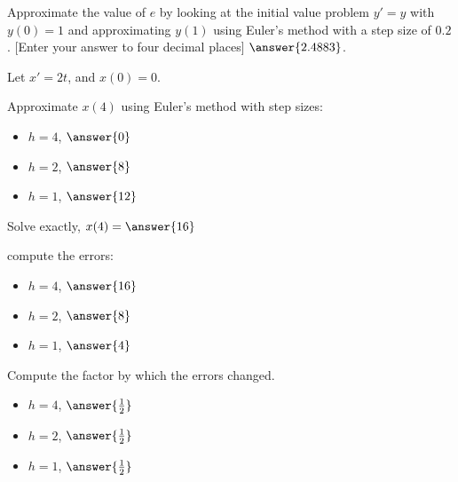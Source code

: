 \documentclass{ximera}
\begin{document}
\begin{exercise}
    Approximate the value of $e$ by looking at the initial value problem $y'=y$ with $y(0)=1$ and approximating $y(1)$ using Euler's method with a step size of $0.2$. [Enter your answer to four decimal places] $\answer{2.4883}$.
\end{exercise}

\begin{exercise}%
    Let $x' = 2t$, and $x(0)=0$.
    
    Approximate $x(4)$ using Euler's method with step sizes:
    \begin{itemize}
        \item $h = 4$, $\answer{0}$
        \item $h = 2$, $\answer{8}$
        \item $h = 1$, $\answer{12}$
    \end{itemize}
    \begin{problem}
        Solve exactly, $x(4) = \answer{16}$ 
        \begin{problem}
            compute the errors: 
            \begin{itemize}
                \item $h = 4$, $\answer{16}$
                \item $h = 2$, $\answer{8}$
                \item $h = 1$, $\answer{4}$
            \end{itemize}
            \begin{problem}
                Compute the factor by which the errors changed.
                \begin{itemize}
                    \item $h = 4$, $\answer{\frac{1}{2}}$
                    \item $h = 2$, $\answer{\frac{1}{2}}$
                    \item $h = 1$, $\answer{\frac{1}{2}}$
                \end{itemize}
            \end{problem}
        \end{problem}
    \end{problem}
\end{exercise}
\end{document}
